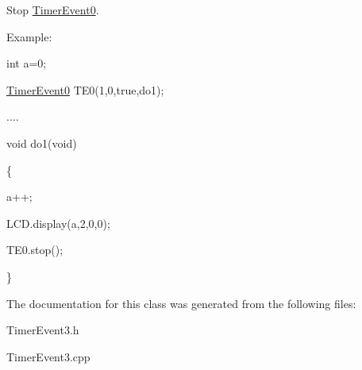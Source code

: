 \label{class_timer_event3_af52f04028de8e391912b41040f29b4fb}
\par
Stop \hyperlink{class_timer_event0}{TimerEvent0}.\par
 \par
Example:\par
\par
 int a=0; \par
 \hyperlink{class_timer_event0}{TimerEvent0} TE0(1,0,true,do1);\par
 .... \par
 void do1(void)\par
 \{ \par
 a++; \par
 LCD.display(a,2,0,0);\par
 TE0.stop(); \par
 \}\par
 

The documentation for this class was generated from the following files:\begin{DoxyCompactItemize}
\item 
TimerEvent3.h\item 
TimerEvent3.cpp\end{DoxyCompactItemize}
